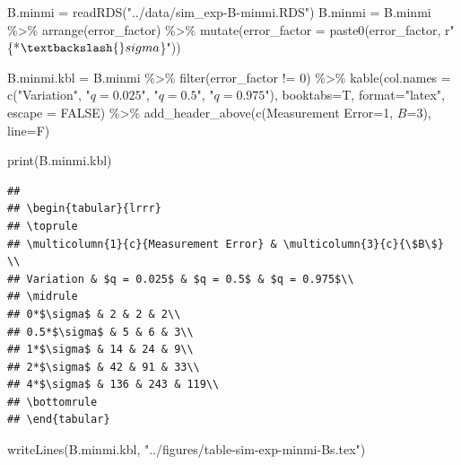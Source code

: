 \documentclass[
]{article}
\newenvironment{Shaded}{\begin{snugshade}}{\end{snugshade}}
\newcommand{\AttributeTok}[1]{\textcolor[rgb]{0.77,0.63,0.00}{#1}}
\newcommand{\ConstantTok}[1]{\textcolor[rgb]{0.00,0.00,0.00}{#1}}
\newcommand{\DecValTok}[1]{\textcolor[rgb]{0.00,0.00,0.81}{#1}}
\newcommand{\FunctionTok}[1]{\textcolor[rgb]{0.00,0.00,0.00}{#1}}
\newcommand{\NormalTok}[1]{#1}
\newcommand{\OtherTok}[1]{\textcolor[rgb]{0.56,0.35,0.01}{#1}}
\newcommand{\SpecialCharTok}[1]{\textcolor[rgb]{0.00,0.00,0.00}{#1}}
\newcommand{\StringTok}[1]{\textcolor[rgb]{0.31,0.60,0.02}{#1}}
\begin{document}
\begin{Shaded}
\begin{Highlighting}[]
\NormalTok{B.minmi }\OtherTok{=} \FunctionTok{readRDS}\NormalTok{(}\StringTok{"../data/sim\_exp{-}B{-}minmi.RDS"}\NormalTok{)}
\NormalTok{B.minmi }\OtherTok{=}\NormalTok{ B.minmi }\SpecialCharTok{\%\textgreater{}\%} \FunctionTok{arrange}\NormalTok{(error\_factor) }\SpecialCharTok{\%\textgreater{}\%} \FunctionTok{mutate}\NormalTok{(}\AttributeTok{error\_factor =} \FunctionTok{paste0}\NormalTok{(error\_factor, r}\StringTok{"\{*$\textbackslash{}sigma$\}"}\NormalTok{))}

\NormalTok{B.minmi.kbl }\OtherTok{=}\NormalTok{ B.minmi }\SpecialCharTok{\%\textgreater{}\%}
  \FunctionTok{filter}\NormalTok{(error\_factor }\SpecialCharTok{!=} \DecValTok{0}\NormalTok{) }\SpecialCharTok{\%\textgreater{}\%}
  \FunctionTok{kable}\NormalTok{(}\AttributeTok{col.names =} \FunctionTok{c}\NormalTok{(}\StringTok{"Variation"}\NormalTok{, }\StringTok{"$q = 0.025$"}\NormalTok{, }\StringTok{"$q = 0.5$"}\NormalTok{, }\StringTok{"$q = 0.975$"}\NormalTok{),}
        \AttributeTok{booktabs=}\NormalTok{T, }\AttributeTok{format=}\StringTok{"latex"}\NormalTok{, }\AttributeTok{escape =} \ConstantTok{FALSE}\NormalTok{) }\SpecialCharTok{\%\textgreater{}\%}
  \FunctionTok{add\_header\_above}\NormalTok{(}\FunctionTok{c}\NormalTok{(}\StringTok{\textasciigrave{}}\AttributeTok{Measurement Error}\StringTok{\textasciigrave{}}\OtherTok{=}\DecValTok{1}\NormalTok{, }\StringTok{\textasciigrave{}}\AttributeTok{$B$}\StringTok{\textasciigrave{}}\OtherTok{=}\DecValTok{3}\NormalTok{), }\AttributeTok{line=}\NormalTok{F)}

\FunctionTok{print}\NormalTok{(B.minmi.kbl)}
\end{Highlighting}
\end{Shaded}

\begin{verbatim}
## 
## \begin{tabular}{lrrr}
## \toprule
## \multicolumn{1}{c}{Measurement Error} & \multicolumn{3}{c}{\$B\$} \\
## Variation & $q = 0.025$ & $q = 0.5$ & $q = 0.975$\\
## \midrule
## 0*$\sigma$ & 2 & 2 & 2\\
## 0.5*$\sigma$ & 5 & 6 & 3\\
## 1*$\sigma$ & 14 & 24 & 9\\
## 2*$\sigma$ & 42 & 91 & 33\\
## 4*$\sigma$ & 136 & 243 & 119\\
## \bottomrule
## \end{tabular}
\end{verbatim}

\begin{Shaded}
\begin{Highlighting}[]
\FunctionTok{writeLines}\NormalTok{(B.minmi.kbl, }\StringTok{"../figures/table{-}sim{-}exp{-}minmi{-}Bs.tex"}\NormalTok{)}
\end{Highlighting}
\end{Shaded}
\end{document}
